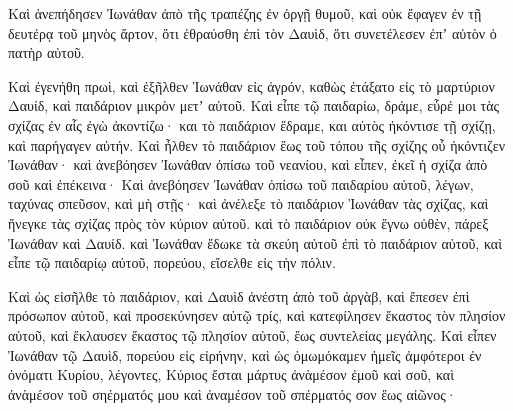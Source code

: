 {Καὶ ἀνεπήδησεν Ἰωνάθαν ἀπὸ τῆς τραπέζης ἐν ὀργῇ θυμοῦ, καὶ οὐκ ἔφαγεν ἐν τῇ δευτέρᾳ τοῦ μηνὸς ἄρτον, ὅτι ἐθραύσθη ἐπὶ τὸν Δαυὶδ, ὅτι συνετέλεσεν ἐπʼ αὐτὸν ὁ πατὴρ αὐτοῦ.
\par }{\PP {}Καὶ ἐγενήθη πρωὶ, καὶ ἐξῆλθεν Ἰωνάθαν εἰς ἀγρόν, καθὼς ἐτάξατο εἰς τὸ μαρτύριον Δαυίδ, καὶ παιδάριον μικρὸν μετʼ αὐτοῦ.
Καὶ εἶπε τῷ παιδαρίω, δράμε, εὗρέ μοι τὰς σχίζας ἐν αἷς ἐγὼ ἀκοντίζω· και τὸ παιδάριον ἔδραμε, και αὐτὸς ἠκόντισε τῇ σχίζῃ, καὶ παρήγαγεν αὐτήν.
Καὶ ἦλθεν τὸ παιδάριον ἕως τοῦ τόπου τῆς σχίζης οὗ ἠκόντιζεν Ἰωνάθαν· καὶ ἀνεβόησεν Ἰωνάθαν ὀπίσω τοῦ νεανίου, καὶ εἶπεν, ἐκεῖ ἡ σχίζα ἀπὸ σοῦ καὶ ἐπέκεινα·
Καὶ ἀνεβόησεν Ἰωνάθαν ὀπίσω τοῦ παιδαρίου αὐτοῦ, λέγων, ταχύνας σπεῦσον, καὶ μὴ στῇς· καὶ ἀνέλεξε τὸ παιδάριον Ἰωνάθαν τὰς σχίζας, καὶ ἤνεγκε τὰς σχίζας πρὸς τὸν κύριον αὐτοῦ.
καὶ τὸ παιδάριον οὐκ ἔγνω οὐθὲν, πάρεξ Ἰωνάθαν καὶ Δαυίδ.
καὶ Ἰωνάθαν ἔδωκε τὰ σκεύη αὐτοῦ ἐπὶ τὸ παιδάριον αὐτοῦ, καὶ εἶπε τῷ παιδαρίῳ αὐτοῦ, πορεύου, εἴσελθε εἰς τὴν πόλιν.
\par }{\PP {}Καὶ ὡς εἰσῆλθε τὸ παιδάριον, καὶ Δαυὶδ ἀνέστη ἀπὸ τοῦ ἀργὰβ, καὶ ἔπεσεν ἐπὶ πρόσωπον αὐτοῦ, καὶ προσεκύνησεν αὐτῷ τρίς, καὶ κατεφίλησεν ἕκαστος τὸν πλησίον αὐτοῦ, καὶ ἔκλαυσεν ἕκαστος τῷ πλησίον αὐτοῦ, ἕως συντελείας μεγάλης.
Καὶ εἶπεν Ἰωνάθαν τῷ Δαυὶδ, πορεύου εἰς εἰρήνην, καὶ ὡς ὀμωμόκαμεν ἡμεῖς ἀμφότεροι ἐν ὀνόματι Κυρίου, λέγοντες, Κύριος ἔσται μάρτυς ἀνὰμέσον ἐμοῦ καὶ σοῦ, καὶ ἀνὰμέσον τοῦ σηέρματός μου καὶ ἀναμέσον τοῦ σπέρματός σον ἕως αἰῶνος·

}
